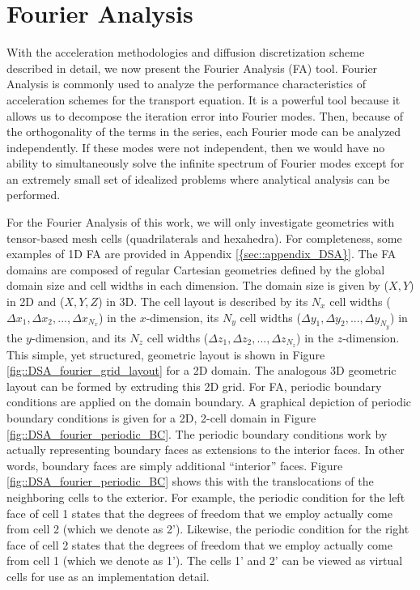 \section{Fourier Analysis}
\label{sec::DSA_Fourier}

With the acceleration methodologies and diffusion discretization scheme described in detail, we now present the Fourier Analysis (FA) tool. Fourier Analysis is commonly used to analyze the performance characteristics of acceleration schemes for the transport equation. It is a powerful tool because it allows us to decompose the iteration error into Fourier modes. Then, because of the orthogonality of the terms in the series, each Fourier mode can be analyzed independently. If these modes were not independent, then we would have no ability to simultaneously solve the infinite spectrum of Fourier modes except for an extremely small set of idealized problems where analytical analysis can be performed.

For the Fourier Analysis of this work, we will only investigate geometries with tensor-based mesh cells (quadrilaterals and hexahedra). For completeness, some examples of 1D FA are provided in Appendix \ref{{sec::appendix_DSA}}. The FA domains are composed of regular Cartesian geometries defined by the global domain size and cell widths in each dimension. The domain size is given by ($X,Y$) in 2D and ($X,Y,Z$) in 3D. The cell layout is described by its $N_x$ cell widths ($\Delta x_{1}, \Delta x_{2}, ..., \Delta x_{N_x}$) in the $x$-dimension, its $N_y$ cell widths ($\Delta y_{1}, \Delta y_{2}, ..., \Delta y_{N_y}$) in the $y$-dimension, and its $N_z$ cell widths ($\Delta z_{1}, \Delta z_{2}, ..., \Delta z_{N_z}$) in the $z$-dimension. This simple, yet structured, geometric layout is shown in Figure \ref{fig::DSA_fourier_grid_layout} for a 2D domain. The analogous 3D geometric layout can be formed by extruding this 2D grid. For FA, periodic boundary conditions are applied on the domain boundary. A graphical depiction of periodic boundary conditions is given for a 2D, 2-cell domain in Figure \ref{fig::DSA_fourier_periodic_BC}. The periodic boundary conditions work by actually representing boundary faces as extensions to the interior faces. In other words, boundary faces are simply additional ``interior'' faces. Figure \ref{fig::DSA_fourier_periodic_BC} shows this with the translocations of the neighboring cells to the exterior. For example, the periodic condition for the left face of cell 1 states that the degrees of freedom that we employ actually come from cell 2 (which we denote as 2'). Likewise, the periodic condition for the right face of cell 2 states that the degrees of freedom that we employ actually come from cell 1 (which we denote as 1'). The cells 1' and 2' can be viewed as virtual cells for use as an implementation detail.

